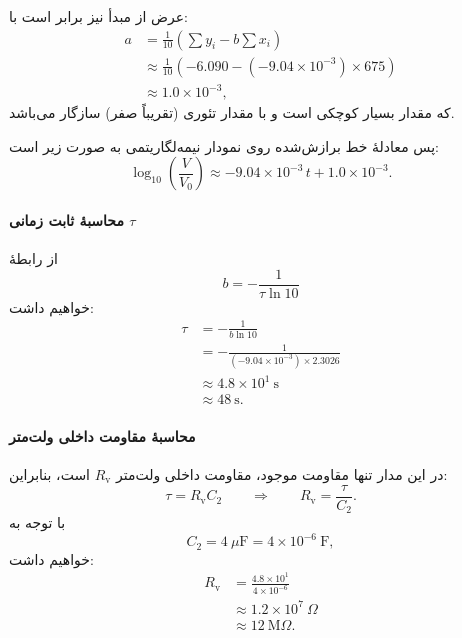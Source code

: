 \documentclass[a4paper, 11pt]{article}
\begin{document}
عرض از مبدأ نیز برابر است با:
\begin{align}
a &= \frac{1}{10}\left(\sum y_i - b\sum x_i\right)\\[1mm]
&\approx \frac{1}{10}\left(-6.090 - (-9.04\times10^{-3})\times 675\right)\\[1mm]
&\approx 1.0\times10^{-3},
\end{align}
که مقدار بسیار کوچکی است و با مقدار تئوری (تقریباً صفر) سازگار می‌باشد.

پس معادلهٔ خط برازش‌شده روی نمودار نیمه‌لگاریتمی به صورت زیر است:
\begin{equation}
\log_{10}\!\left(\frac{V}{V_0}\right)
  \approx -9.04\times10^{-3}\, t + 1.0\times10^{-3}.
\end{equation}

\paragraph{محاسبهٔ ثابت زمانی \texorpdfstring{$\tau$}{tau}}

از رابطهٔ
\begin{equation}
b = -\frac{1}{\tau \ln 10}
\end{equation}
خواهیم داشت:
\begin{align}
\tau &= -\frac{1}{b\ln 10} \\[1mm]
&= -\frac{1}{(-9.04\times10^{-3})\times 2.3026} \\[1mm]
&\approx 4.8\times10^{1}\ \mathrm{s} \\[1mm]
&\approx 48\ \mathrm{s}.
\end{align}

\paragraph{محاسبهٔ مقاومت داخلی ولت‌متر}

در این مدار تنها مقاومت موجود، مقاومت داخلی ولت‌متر $R_\mathrm{v}$ است، بنابراین:
\begin{equation}
\tau = R_\mathrm{v} C_2
\qquad\Rightarrow\qquad
R_\mathrm{v} = \frac{\tau}{C_2}.
\end{equation}
با توجه به
\[
C_2 = 4~\mu\mathrm{F} = 4\times10^{-6}~\mathrm{F},
\]
خواهیم داشت:
\begin{align}
R_\mathrm{v}
&= \frac{4.8\times10^{1}}{4\times10^{-6}} \\[1mm]
&\approx 1.2\times10^{7}\ \Omega \\[1mm]
&\approx 12~\mathrm{M}\Omega.
\end{align}
\end{document}
